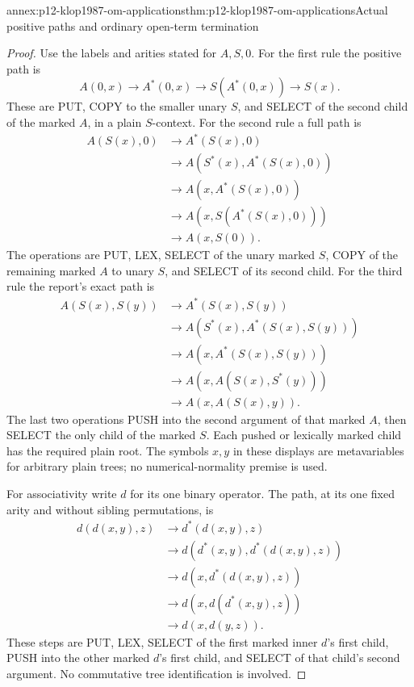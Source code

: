 \begin{annexitem}{annex:p12-klop1987-om-applications}{thm:p12-klop1987-om-applications}{Actual positive paths and ordinary open-term termination}
\begin{proof}
Use the labels and arities stated for \(A,S,0\). For the first
rule the positive path is
\[
 A(0,x)\longrightarrow A^*(0,x)
 \longrightarrow S(A^*(0,x))\longrightarrow S(x).
\]
These are PUT, COPY to the smaller unary \(S\), and SELECT of
the second child of the marked \(A\), in a plain \(S\)-context.
For the second rule a full path is
\begin{align*}
 A(S(x),0)&\longrightarrow A^*(S(x),0)\\
 &\longrightarrow A(S^*(x),A^*(S(x),0))\\
 &\longrightarrow A(x,A^*(S(x),0))\\
 &\longrightarrow A(x,S(A^*(S(x),0)))\\
 &\longrightarrow A(x,S(0)).
\end{align*}
The operations are PUT, LEX, SELECT of the unary marked \(S\),
COPY of the remaining marked \(A\) to unary \(S\), and SELECT
of its second child. For the third rule the report's exact path is
\begin{align*}
 A(S(x),S(y))&\longrightarrow A^*(S(x),S(y))\\
 &\longrightarrow A(S^*(x),A^*(S(x),S(y)))\\
 &\longrightarrow A(x,A^*(S(x),S(y)))\\
 &\longrightarrow A(x,A(S(x),S^*(y)))\\
 &\longrightarrow A(x,A(S(x),y)).
\end{align*}
The last two operations PUSH into the second argument of that
marked \(A\), then SELECT the only child of the marked \(S\).
Each pushed or lexically marked child has the required plain root.
The symbols \(x,y\) in these displays are metavariables for
arbitrary plain trees; no numerical-normality premise is used.

For associativity write \(d\) for its one binary operator. The
path, at its one fixed arity and without sibling permutations, is
\begin{align*}
 d(d(x,y),z)&\longrightarrow d^*(d(x,y),z)\\
 &\longrightarrow d(d^*(x,y),d^*(d(x,y),z))\\
 &\longrightarrow d(x,d^*(d(x,y),z))\\
 &\longrightarrow d(x,d(d^*(x,y),z))\\
 &\longrightarrow d(x,d(y,z)).
\end{align*}
These steps are PUT, LEX, SELECT of the first marked inner
\(d\)'s first child, PUSH into the other marked \(d\)'s first
child, and SELECT of that child's second argument. No commutative
tree identification is involved.


\end{proof}
\end{annexitem}
